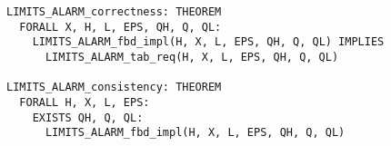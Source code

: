\documentclass{article}
\begin{document}
\begin{lstlisting}[language=pvs,numbers=none]
LIMITS_ALARM_correctness: THEOREM
  FORALL X, H, L, EPS, QH, Q, QL:
    LIMITS_ALARM_fbd_impl(H, X, L, EPS, QH, Q, QL) IMPLIES 
      LIMITS_ALARM_tab_req(H, X, L, EPS, QH, Q, QL)

LIMITS_ALARM_consistency: THEOREM
  FORALL H, X, L, EPS:
    EXISTS QH, Q, QL:
      LIMITS_ALARM_fbd_impl(H, X, L, EPS, QH, Q, QL)
\end{lstlisting}
\end{document}
